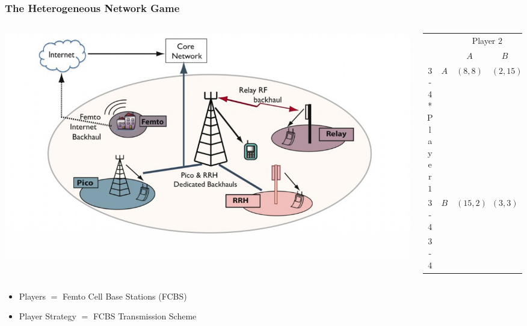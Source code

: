 \documentclass[10pt,tgadventor, onlymath]{beamer}
\begin{document}
\begin{frame}
\frametitle{The Heterogeneous Network Game}
\begin{columns}

\begin{column}{0.5\linewidth}
	\includegraphics[width=\textwidth]{het_net}

\end{column}
\begin{column}{0.5\linewidth}
\begin{table}
    \setlength{\extrarowheight}{2pt}
    \begin{tabular}{cc|c|c|}
      & \multicolumn{1}{c}{} & \multicolumn{2}{c}{Player $2$}\\
      & \multicolumn{1}{c}{} & \multicolumn{1}{c}{$A$}  & \multicolumn{1}{c}{$B$} \\\cline{3-4}
      \multirow{2}*{Player $1$}  & $A$ & $(8,8)$ & $(2,15)$ \\\cline{3-4}
      & $B$ & $(15,2)$ & $(3,3)$ \\\cline{3-4}
    \end{tabular}
  \end{table}
\end{column}
\end{columns}
\bigskip
\begin{itemize}
\item 
	Players $=$ Femto Cell Base Stations (FCBS)
\item 
	Player Strategy $=$ FCBS Transmission Scheme
\end{itemize}

\end{frame}
\end{document}
